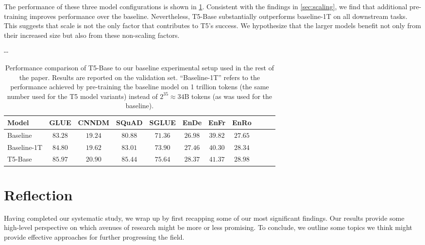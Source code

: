 \documentclass[twoside,11pt]{article}
\newlength{\offsetpage}
\newenvironment{widepage}{\begin{adjustwidth}{-\offsetpage}{-\offsetpage}
    \addtolength{\textwidth}{2\offsetpage}}
{\end{adjustwidth}}
\newcommand{\bsl}{\makebox[0pt][r]{\raisebox{0.05em}{$\bigstar\,$}}}
\def\*#1{\mathbf{#1}}
\begin{document}
The performance of these three model configurations is shown in \cref{tab:insight_impact}.
Consistent with the findings in \cref{sec:scaling}, we find that additional pre-training improves performance over the baseline.
Nevertheless, T5-Base substantially outperforms baseline-1T on all downstream tasks.
This suggests that scale is not the only factor that contributes to T5's success.
We hypothesize that the larger models benefit not only from their increased size but also from these non-scaling factors.

\begin{table}
\footnotesize
\begin{widepage}
\centering
\begin{tabular}{l c c c c c c c c c c}
\toprule
    Model          & GLUE        & CNNDM       & SQuAD       & SGLUE       & EnDe        & EnFr        & EnRo    \\
\midrule
    \bsl Baseline  & $83.28$     & $19.24$     & $80.88$     & $71.36$     & $26.98$     & $39.82$     & $27.65$ \\
    Baseline-1T    & $84.80$     & $19.62$     & $83.01$     & $73.90$     & $27.46$     & $40.30$     & $28.34$ \\
    T5-Base        & $\*{85.97}$ & $\*{20.90}$ & $\*{85.44}$ & $\*{75.64}$ & $\*{28.37}$ & $\*{41.37}$ & $\*{28.98}$ \\
\bottomrule
\end{tabular}
\end{widepage}
\caption{
Performance comparison of T5-Base to our baseline experimental setup used in the rest of the paper.
Results are reported on the validation set.
``Baseline-1T'' refers to the performance achieved by pre-training the baseline model on 1 trillion tokens (the same number used for the T5 model variants) instead of $2^{35} \approx 34\mathrm{B}$ tokens (as was used for the baseline).
}
\label{tab:insight_impact}
\end{table}

\section{Reflection}
\label{sec:conclusion}

Having completed our systematic study, we wrap up by first recapping some of our most significant findings.
Our results provide some high-level perspective on which avenues of research might be more or less promising.
To conclude, we outline some topics we think might provide effective approaches for further progressing the field.
\end{document}
